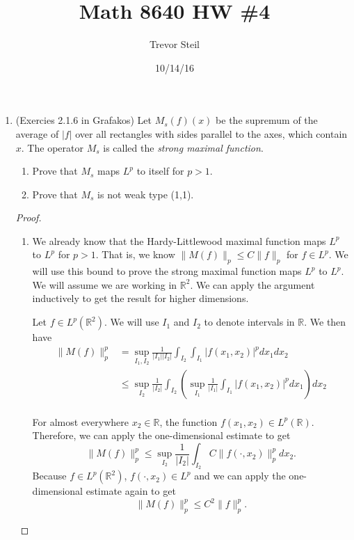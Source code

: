\documentclass[a4paper]{article}
\title{Math 8640 HW \#4}
\date{10/14/16}
\author{Trevor Steil}
\newcommand{\R}{\mathbb{R}}
\begin{document}
\maketitle

\begin{enumerate}
  \item (Exercies 2.1.6 in Grafakos) Let $M_s(f)(x)$ be the supremum of the average of $|f|$ over all rectangles with sides parallel to the axes,
    which contain $x$. The operator $M_s$ is called the \textit{strong maximal function}.

    \begin{enumerate}
      \item Prove that $M_s$ maps $L^p$ to itself for $p>1$.
      \item Prove that $M_s$ is not weak type (1,1).
    \end{enumerate}

    \begin{proof}
      \begin{enumerate}
        \item
          We already know that the Hardy-Littlewood maximal function maps $L^p$ to $L^p$ for $p>1$. That is, we know $\| M(f) \|_p \leq C \| f \|_p$
          for $f \in L^p$. We will use this bound to prove the strong maximal function maps $L^p$ to $L^p$. We will assume we are working in $\R^2$.
          We can apply the argument inductively to get the result for higher dimensions.

          Let $f \in L^p(\R^2)$. We will use $I_1$ and $I_2$ to denote intervals in $\R$. We then have
          \begin{align*}
            \| M(f) \|_p^p &= \sup_{I_1, I_2} \frac{1}{|I_1| |I_2|} \int_{I_2}^{} \int_{I_1}^{} |f(x_1, x_2)|^p dx_1 dx_2 \\
            &\leq \sup_{I_2} \frac{1}{|I_2|} \int_{I_2}^{} \left( \sup_{I_1} \frac{1}{|I_1|} \int_{I_1}^{} |f(x_1, x_2)|^p dx_1 \right) dx_2 \\
          \end{align*}

          For almost everywhere $x_2 \in \R$, the function $f(x_1, x_2) \in L^p(\R)$. Therefore, we can apply the one-dimensional estimate to get
          \[ \| M(f) \|_p^p \leq \sup_{ I_2 } \frac{1}{|I_2|} \int_{I_2}^{} C \| f( \cdot, x_2) \|_p^p dx_2 .\]
          Because $f \in L^p(\R^2)$, $f(\cdot, x_2) \in L^p$ and we can apply the one-dimensional estimate again to get
          \[ \| M(f) \|_p^p \leq C^2 \|f\|_p^p .\]


\end{enumerate}
\end{proof}
\end{enumerate}
\end{document}
